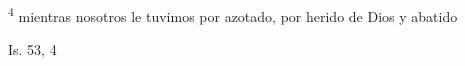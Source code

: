 \documentclass[../../rosario.tex]{subfiles}
\begin{document}
    \textsuperscript{4} mientras nosotros le tuvimos por azotado, por herido de Dios y abatido
    \begin{flushright}
    Is. 53, 4 
    \end{flushright}
\end{document}
